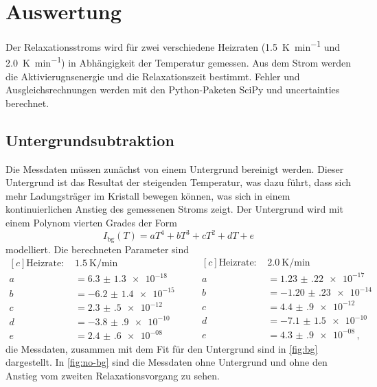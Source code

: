 \section{Auswertung}

Der Relaxationsstroms wird für zwei verschiedene Heizraten (\SI{1.5}{\kelvin\per\minute} und \SI{2.0}{\kelvin\per\minute}) in Abhängigkeit der Temperatur gemessen. Aus dem Strom werden die Aktivierugnsenergie und die Relaxationszeit bestimmt. Fehler und Ausgleichsrechnungen werden mit den Python-Paketen SciPy \cite{scipy} und uncertainties \cite{uncertain} berechnet.

\subsection{Untergrundsubtraktion}

Die Messdaten müssen zunächst von einem Untergrund bereinigt werden. Dieser Untergrund ist das Resultat der steigenden Temperatur, was dazu führt, dass sich mehr Ladungsträger im Kristall bewegen können, was sich in einem kontinuierlichen Anstieg des gemessenen Stroms zeigt. Der Untergrund wird mit einem Polynom vierten Grades der Form
\begin{equation}
  I_\text{bg}(T) = aT^4 + bT^3 + cT^2 + dT + e
\end{equation}
modelliert. Die berechneten Parameter sind
\begin{equation*}
\begin{aligned}[c]
  \text{Heizrate: }& \SI{1.5}{\kelvin\per\minute}\\
  a &= \num{6.3(13)e-18}\\
  b &= \num{-6.2(14)e-15}\\
  c &= \num{2.3(5)e-12}\\
  d &= \num{-3.8(9)e-10}\\
  e &= \num{2.4(6)e-08}
\end{aligned}
\qquad
\begin{aligned}[c]
  \text{Heizrate: }& \SI{2.0}{\kelvin\per\minute}\\
  a &= \num{1.23(22)e-17}\\
  b &= \num{-1.20(23)e-14}\\
  c &= \num{4.4(9)e-12}\\
  d &= \num{-7.1(15)e-10}\\
  e &= \num{4.3(9)e-08}\,,
\end{aligned}
\end{equation*}
die Messdaten, zusammen mit dem Fit für den Untergrund sind in \autoref{fig:bg} dargestellt. In \autoref{fig:no-bg} sind die Messdaten ohne Untergrund und ohne den Anstieg vom zweiten Relaxationsvorgang zu sehen.

